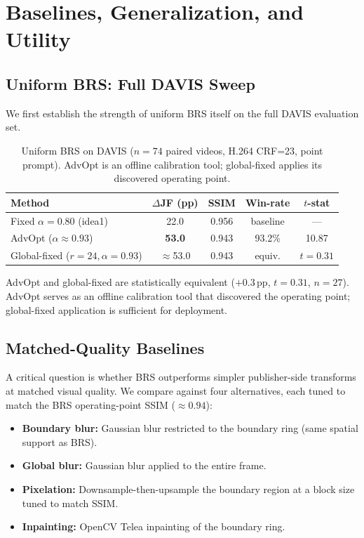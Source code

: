 \section{Baselines, Generalization, and Utility}
\label{sec:baselines}

\subsection{Uniform BRS: Full DAVIS Sweep}

We first establish the strength of uniform BRS itself on the full DAVIS evaluation set.

\begin{table}[t]
\centering
\small
\caption{Uniform BRS on DAVIS ($n{=}74$ paired videos, H.264 CRF=23, point prompt). AdvOpt is an offline calibration tool; global-fixed applies its discovered operating point.}
\label{tab:davis_full}
\begin{tabular}{lcccc}
\toprule
\textbf{Method} & \textbf{$\Delta$JF (pp)} & \textbf{SSIM} & \textbf{Win-rate} & \textbf{$t$-stat} \\
\midrule
Fixed $\alpha{=}0.80$ (idea1) & 22.0 & 0.956 & baseline & --- \\
AdvOpt ($\alpha{\approx}0.93$) & \textbf{53.0} & 0.943 & 93.2\% & 10.87 \\
Global-fixed ($r{=}24, \alpha{=}0.93$) & $\approx$53.0 & 0.943 & equiv. & $t{=}0.31$ \\
\bottomrule
\end{tabular}
\end{table}

AdvOpt and global-fixed are statistically equivalent ($+0.3\,\mathrm{pp}$, $t{=}0.31$, $n{=}27$).
AdvOpt serves as an offline calibration tool that discovered the operating point; global-fixed application is sufficient for deployment.

\subsection{Matched-Quality Baselines}

A critical question is whether BRS outperforms simpler publisher-side transforms at matched visual quality.
We compare against four alternatives, each tuned to match the BRS operating-point SSIM (${\approx}0.94$):

\begin{itemize}
  \item \textbf{Boundary blur:} Gaussian blur restricted to the boundary ring (same spatial support as BRS).
  \item \textbf{Global blur:} Gaussian blur applied to the entire frame.
  \item \textbf{Pixelation:} Downsample-then-upsample the boundary region at a block size tuned to match SSIM.
  \item \textbf{Inpainting:} OpenCV Telea inpainting of the boundary ring.
\end{itemize}

